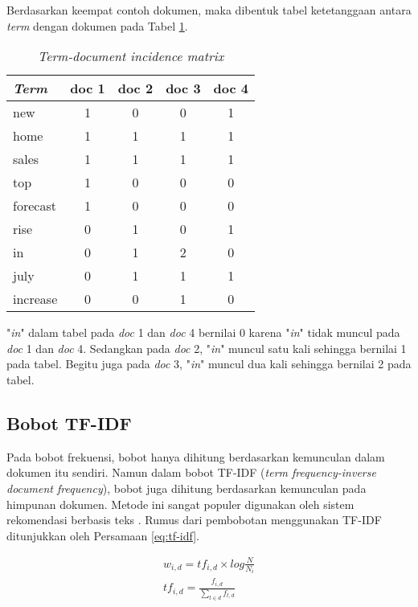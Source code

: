 Berdasarkan keempat contoh dokumen, maka dibentuk tabel ketetanggaan antara \textit{term} dengan dokumen pada Tabel \ref{tbl:term-doc}.

\begin{table}[h]
\centering
\begin{tabular}{|l|c|c|c|c|} \hline
	\textit{Term} & doc 1 & doc 2 & doc 3 & doc 4 \\ \hline
	new		&	1	&	0	&	0	&	1	\\
	home	&	1	&	1	&	1	&	1	\\
	sales	&	1	&	1	&	1	&	1	\\
	top		&	1	&	0	&	0	&	0	\\
	forecast&	1	&	0	&	0	&	0	\\
	rise	&	0	&	1	&	0	&	1	\\
	in		&	0	&	1	&	2	&	0	\\
	july	&	0	&	1	&	1	&	1	\\
	increase&	0	&	0	&	1	&	0	\\ \hline
\end{tabular}
\caption{\textit{Term-document incidence matrix}}
\label{tbl:term-doc}
\end{table}

\Term "\textit{in}" dalam tabel pada \textit{doc} 1 dan \textit{doc} 4 bernilai 0 karena \term "\textit{in}" tidak muncul pada \textit{doc} 1 dan \textit{doc} 4. Sedangkan pada \textit{doc} 2, \term "\textit{in}" muncul satu kali sehingga bernilai 1 pada tabel. Begitu juga pada \textit{doc} 3, \term "\textit{in}" muncul dua kali sehingga bernilai 2 pada tabel.

\subsection{Bobot TF-IDF}
\label{sub:tf-idf}
Pada bobot frekuensi, bobot hanya dihitung berdasarkan kemunculan \term dalam dokumen itu sendiri. Namun dalam bobot TF-IDF (\textit{term frequency-inverse document frequency}), bobot juga dihitung berdasarkan kemunculan \term pada himpunan dokumen. Metode ini sangat populer digunakan oleh sistem rekomendasi berbasis teks \cite{aizawa2003information}. Rumus dari pembobotan menggunakan TF-IDF ditunjukkan oleh Persamaan \ref{eq:tf-idf}.

\begin{equation}
	\label{eq:tf-idf}
	\begin{gathered}
	w_{i,d}=tf_{i,d} \times log \frac{N}{N_i} \\
	tf_{i,d}=\frac{f_{i,d}}{\sum_{t \in d}f_{t,d}}
	\end{gathered}
\end{equation}

